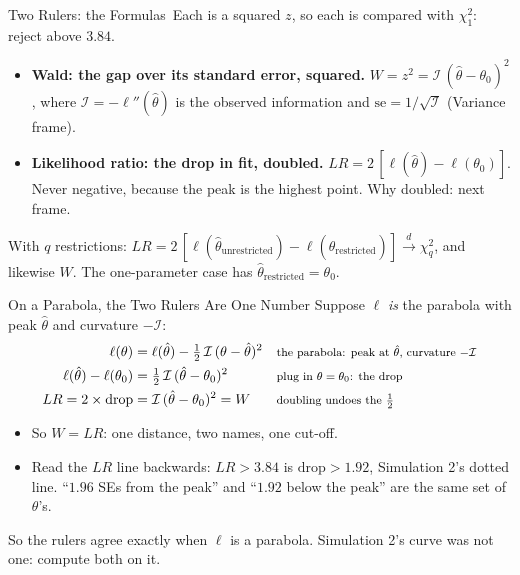 \documentclass[aspectratio=169,11pt,xcolor=dvipsnames]{beamer}
\newcommand{\dto}{\overset{d}{\longrightarrow}}
\newcommand{\loglik}{\ell}
\newcommand{\Info}{\mathcal{I}}
\newcommand{\SE}{\mathrm{se}}
\newcommand{\core}{\,\raisebox{0.6pt}{\textcolor{corestar}{$\bigstar$}}}
\begin{document}
\begin{frame}{Two Rulers: the Formulas\core}
Each is a squared $z$, so each is compared with $\chi^2_1$: reject above
$3.84$.
\begin{itemize}\itemsep6pt
  \item \textbf{Wald: the gap over its standard error, squared.}
        $W = z^2 = \Info\,(\hat\theta-\theta_0)^2$, where
        $\Info = -\loglik''(\hat\theta)$ is the observed information and
        $\SE = 1/\sqrt{\Info}$ (Variance frame).
  \item \textbf{Likelihood ratio: the drop in fit, doubled.}
        $LR = 2\,[\loglik(\hat\theta) - \loglik(\theta_0)]$. Never negative,
        because the peak is the highest point. Why doubled: next frame.
\end{itemize}
\vskip4pt
{\footnotesize With $q$ restrictions:
$LR = 2\,[\loglik(\hat\theta_{\text{unrestricted}}) -
\loglik(\hat\theta_{\text{restricted}})] \dto \chi^2_q$, and likewise $W$.
The one-parameter case has $\hat\theta_{\text{restricted}} = \theta_0$.}
\end{frame}

\begin{frame}{On a Parabola, the Two Rulers Are One Number}
Suppose $\loglik$ \emph{is} the parabola with peak $\hat\theta$ and
curvature $-\Info$:
\begingroup
\setlength{\abovedisplayskip}{2pt}\setlength{\belowdisplayskip}{2pt}
\begin{align*}
  \loglik(\theta) &= \loglik(\hat\theta) - \tfrac12\,\Info\,(\theta-\hat\theta)^2
    && \text{\footnotesize the parabola: peak at $\hat\theta$, curvature $-\Info$} \\
  \loglik(\hat\theta) - \loglik(\theta_0) &= \tfrac12\,\Info\,(\hat\theta-\theta_0)^2
    && \text{\footnotesize plug in $\theta = \theta_0$: the drop} \\
  LR = 2 \times \text{drop} &= \Info\,(\hat\theta-\theta_0)^2 = W
    && \text{\footnotesize doubling undoes the $\tfrac12$}
\end{align*}
\endgroup
\begin{itemize}\itemsep2pt
  \item So $W = LR$: one distance, two names, one cut-off.
  \item Read the $LR$ line backwards: $LR > 3.84$ is $\text{drop} > 1.92$,
        Simulation 2's dotted line. ``$1.96$ SEs from the peak'' and
        ``$1.92$ below the peak'' are the same set of $\theta$'s.
\end{itemize}
So the rulers agree exactly when \alert{$\loglik$ is a parabola}.
Simulation 2's curve was not one: compute both on it.
\end{frame}
\end{document}
